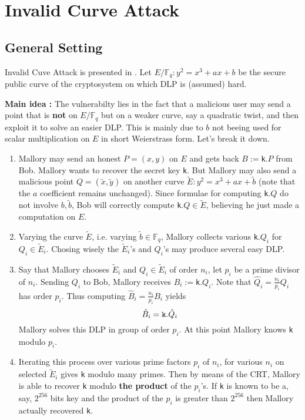 \documentclass[10pt]{article}
\theoremstyle{definition}
\newcommand{\F}{\mathbb{F}}
\begin{document}
\section{Invalid Curve Attack}
\subsection{General Setting}

Invalid Cuve Attack is presented in \cite{FLRV08}.
Let $E/\F_q : y^2 = x^3+ax+b$ be the secure public curve of the cryptosystem on which DLP is (assumed) hard.

\vspace*{.5cm}
\textbf{Main idea :} The vulnerabilty lies in the fact that a malicious user may send a point that is \textbf{not} on $E/\F_q$ but on a weaker curve, say a quadratic twist, and then exploit it to solve an easier DLP.
This is mainly due to $b$ not beeing used for scalar multiplication on $E$ in short Weierstrass form.
Let's break it down.

\begin{enumerate}
\item Mallory may send an honest $P = (x,y)$ on $E$ and gets back $B:=$\verb|k|$.P$ from Bob.
Mallory wants to recover the secret key \verb|k|.
But Mallory may also send a malicious point $Q = ( \tilde{x},\tilde{y})$ 
on another curve $\tilde{E} : y^2 = x^3+ax+\tilde{b}$ (note that the $a$ coefficient remains unchanged).
Since formulae for computing \verb|k|$.Q$ do not involve $b, \tilde{b}$, Bob will correctly compute \verb|k|$.Q \in \tilde{E}$, believing he just made a computation on $E$.
\item Varying the curve $\tilde{E}$,  i.e. varying $\tilde{b} \in \F_q$, Mallory collects various \verb|k|$.Q_i$ for $Q_i \in \tilde{E}_i$.
Chosing wisely the $\tilde{E}_i$'s and $Q_i$'s may produce several easy DLP.
\item Say that Mallory chooses $\tilde{E}_i$ and  $Q_i \in \tilde{E}_i$ of order $n_i$, let $p_i$ be a prime divisor of $n_i$.
Sending $Q_i$ to Bob, Mallory receives $B_i:=$\verb|k|$.Q_i$.
Note that $\hat{Q}_i=\frac{n_i}{p_i}Q_i$ has order $p_i$.
Thus computing $\hat{B}_i=\frac{n_i}{p_i}B_i$ yields
\[ \hat{B}_i =  \verb|k|.\hat{Q}_i\]
Mallory solves this DLP in group of order $p_i$.
At this point Mallory knows \verb|k| modulo $p_i$. 
\item Iterating this process over various prime factors $p_i$ of $n_i$, for various $n_i$ on selected $\tilde{E}_i$ gives \verb|k| modulo many primes.
Then by means of the CRT, Mallory is able to recover \verb|k| modulo \textbf{the product} of the $p_i$'s.
If \verb|k| is known to be a, say, $2^{256}$ bits key and the product of the $p_i$ is greater than $2^{256}$ then Mallory actually recovered  \verb|k|.
\end{enumerate}
\end{document}
